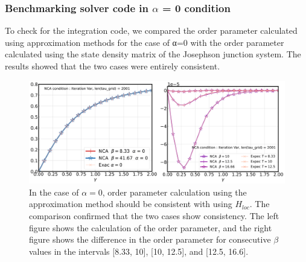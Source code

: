 \documentclass{article}[12pt]
\begin{document}
\begin{spacing}{1.5}
\subsubsection*{Benchmarking solver code in $\alpha$ = 0 condition}
To check for the integration code, we compared the order parameter calculated using approximation methods for the case of α=0 
with the order parameter calculated using the state density matrix of the Josephson junction system. 
The results showed that the two cases were entirely consistent.
\begin{figure}[H]
  \centerline{\includegraphics[width=15cm]{TexFigure/4_1_03_zero.png}}
  \caption{In the case of $\alpha = 0$, order parameter calculation using the approximation method should be consistent with using $H_{loc}$.
  The comparison confirmed that the two cases show consistency. The left figure shows the calculation of the order parameter, 
  and the right figure shows the difference in the order parameter for consecutive $\beta$ values
  in the intervals [8.33, 10], [10, 12.5], and [12.5, 16.6].}
 \end{figure}
\pagebreak

\end{spacing}
\end{document}
